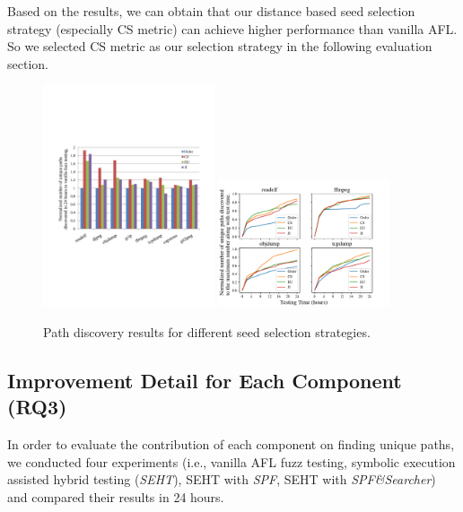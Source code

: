 Based on the results, we can obtain that our distance based seed 
selection strategy (especially CS metric) can achieve 
higher performance than vanilla AFL. So we selected CS metric as 
our selection strategy in the following evaluation section.

\begin{figure}[!t]
	\includegraphics[width=0.45\textwidth, trim={0.2cm 0.4cm 0cm 0cm}, clip]
	{figures/path-discovery.pdf}
	\includegraphics[width=0.45\textwidth, trim={0.15cm 0.1cm 1.5cm 0.8cm}, clip]
	{figures/path-time-detail.pdf} 
	\label{fig1}
  \caption{Path discovery results for different seed selection strategies.}
  \label{path-detail}
\end{figure} 

\subsection{Improvement Detail for Each Component (RQ3)} \label{sec:RQ3}
In order to evaluate the contribution of each component on finding 
unique paths, we conducted four experiments (i.e., vanilla AFL fuzz testing, 
symbolic execution assisted hybrid testing (\textit{SEHT}), SEHT with \textit{SPF}, 
SEHT with \textit{SPF\&Searcher}) and compared their results in 24 hours.

